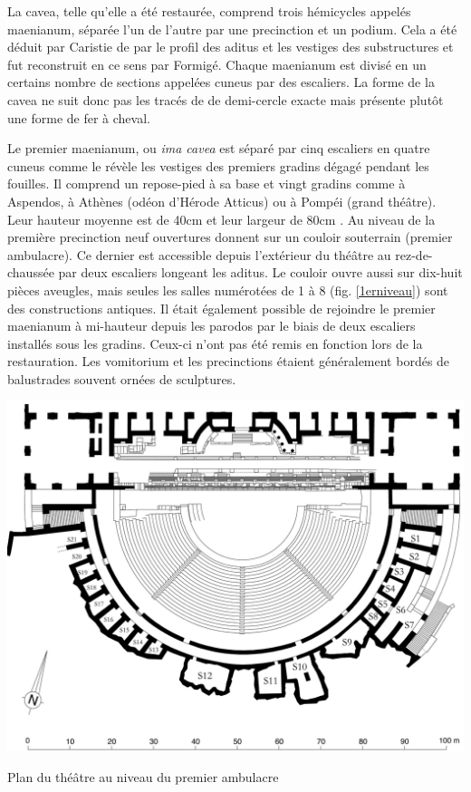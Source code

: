 		La  \gls{cavea}, telle qu'elle a été restaurée, comprend trois hémicycles appelés \gls{maenianum}, séparée l'un de l'autre par une \gls{precinction} et un \gls{podium}. Cela a été déduit par Caristie de par le profil des \gls{aditus} et les vestiges des substructures et fut reconstruit en ce sens par Formigé. Chaque \gls{maenianum} est divisé en un certains nombre de sections appelées \gls{cuneus} par des escaliers. La forme de la \gls{cavea} ne suit donc pas les tracés de \cite{vitruve} de demi-cercle exacte mais présente plutôt une forme de fer à cheval.
		
		
Le premier \gls{maenianum}, ou \textit{ima cavea} est séparé par cinq escaliers en quatre \gls{cuneus} comme le révèle les vestiges des premiers gradins dégagé pendant les fouilles. Il comprend un repose-pied à sa base et vingt gradins comme à Aspendos, à Athènes (odéon d'Hérode Atticus) ou à Pompéi (grand théâtre). Leur hauteur moyenne est de 40cm et leur largeur de 80cm \cite{formige}. Au niveau de la première \gls{precinction} neuf ouvertures donnent  sur un couloir souterrain (premier \gls{ambulacre}). Ce dernier est accessible depuis l'extérieur du théâtre au rez-de-chaussée par deux escaliers longeant les \gls{aditus}. Le couloir ouvre aussi sur dix-huit pièces aveugles, mais seules les salles numérotées de 1 à 8 (fig. \ref{1erniveau}) sont des constructions antiques. Il était également possible de rejoindre le premier \gls{maenianum} à mi-hauteur depuis les \gls{parodos} par le biais de deux escaliers installés sous les gradins. Ceux-ci n'ont pas été remis en fonction lors de la restauration. Les \gls{vomitorium} et les \glspl{precinction} étaient généralement bordés de balustrades souvent ornées de sculptures.
		
	\begin{figureth}
		\includegraphics[width=\linewidth]{images/1erniveau}
		\caption[Vue de dessus - 1er niveau]{Plan du théâtre au niveau du premier ambulacre \cite[Pl. XVII]{orangePl}}
		\label{1erniveau}
	\end{figureth}		
		
